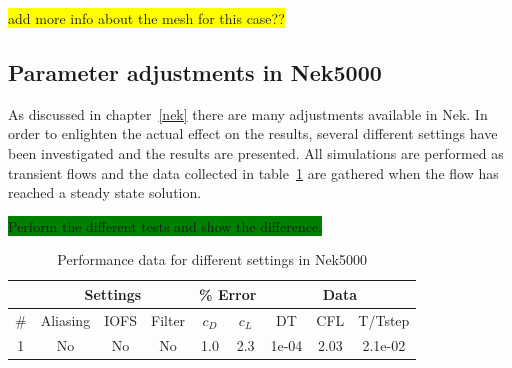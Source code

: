 \colorbox{yellow}{add more info about the mesh for this case??}

\subsection{Parameter adjustments in Nek5000}
As discussed in chapter~\ref{nek} there are many adjustments available in Nek. 
In order to enlighten the actual effect on the results, several different settings have 
been investigated and the results are presented. All simulations are performed as 
transient flows and the data collected in table~\ref{tab:perf} are gathered when the 
flow has reached a steady state solution. 

\colorbox{green}{Perform the different tests and show the difference.}

\begin{table}[h]
    \centering
    \begin{tabular}{c | c c c | c c | c c c}

         & \multicolumn{3}{|c|}{Settings} & \multicolumn{2}{|c|}{\% Error} & \multicolumn{3}{|c}{Data} \\\hline
         \#  & Aliasing & IOFS & Filter & $c_D$ & $c_L$ 
         & DT & CFL & T/Tstep \\ \hline 
         1 & No & No & No & 1.0 & 2.3 & 1e-04 & 2.03 & 2.1e-02 \\
    \end{tabular}
    \caption{Performance data for different settings in Nek5000}
    \label{tab:perf}
\end{table}
